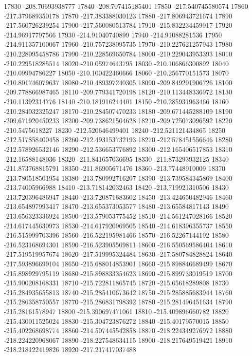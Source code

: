 {17830 -208.70693938777
17840 -208.707415185401
17850 -217.540745580574
17860 -217.379689350178
17870 -217.383388030123
17880 -217.806943721674
17890 -217.560726239254
17900 -217.560080513784
17910 -215.832234459917
17920 -214.96917797566
17930 -214.91040740899
17940 -214.91088281536
17950 -214.911357100067
17960 -210.757238095735
17970 -210.227621257943
17980 -210.228095458786
17990 -210.228569650784
18000 -210.229043953393
18010 -210.229518285514
18020 -210.05974643795
18030 -210.106866300892
18040 -210.09994786227
18050 -210.100422460666
18060 -210.256770151573
18070 -210.801746079637
18080 -210.489397240305
18090 -209.849291906726
18100 -209.778866987465
18110 -209.779341720198
18120 -210.113448336972
18130 -210.11392314776
18140 -210.181916244401
18150 -210.285931963466
18160 -210.284032325247
18170 -210.284507470233
18180 -209.671445288109
18190 -209.671920450233
18200 -209.738621504628
18210 -209.725073096592
18220 -210.5475618227
18230 -212.520646499401
18240 -212.521121434865
18250 -212.517858400458
18260 -212.493153732193
18270 -212.578451556646
18280 -212.578926532146
18290 -212.536653776892
18300 -212.165406517853
18310 -212.16588148036
18320 -211.841657036695
18330 -211.873293932125
18340 -211.873768815791
18350 -211.86905671476
18360 -213.77448910009
18370 -213.780518501954
18380 -213.780992716207
18390 -213.739584345869
18400 -213.74005966988
18410 -213.718142032463
18420 -213.719921310506
18430 -213.720396486947
18440 -213.720871683602
18450 -213.424650482946
18460 -213.654897993417
18470 -213.655373053577
18480 -213.65584817143
18490 -213.656323336924
18500 -213.579053775452
18510 -214.561247028166
18520 -214.617445630973
18530 -214.617920969505
18540 -214.618396355737
18550 -216.515999703396
18560 -216.522195981466
18570 -216.52267144192
18580 -216.523168694301
18590 -216.523905509811
18600 -216.550569586404
18610 -217.519519957674
18620 -217.519995324484
18630 -217.580784828824
18640 -217.593896699104
18650 -215.688014853901
18660 -215.898846689499
18670 -215.898929795119
18680 -215.898833354623
18690 -215.899733019519
18700 -215.900208168331
18710 -215.722811865745
18720 -215.65618289808
18730 -215.284935655813
18740 -215.285410673642
18750 -215.285885683944
18760 -215.286358750557
18770 -215.286831798392
18780 -215.281496451634
18790 -215.28161578947
18800 -215.390697471061
18810 -215.409896660782
18820 -215.430011525024
18830 -215.304723876272
18840 -215.40179570015
18850 -215.402268698774
18860 -214.507445542858
18870 -218.224349276972
18880 -218.224220968067
18890 -218.227548634115
18900 -218.217649519421
18910 -218.218122419826
18920 -217.217417037488
}
